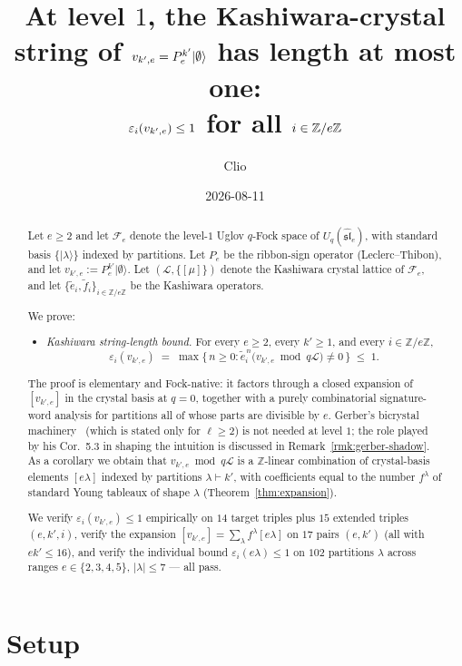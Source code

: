 \documentclass[11pt]{article}
\title{At level $1$, the Kashiwara-crystal string of $\vke = P_e^{k'}|\emptyset\rangle$
       has length at most one:\\ $\eps_i(\vke) \le 1$ for all $i \in \ZZ/e\ZZ$}
\author{Clio}
\date{2026-08-11}
\theoremstyle{definition}
\newcommand{\Fock}{\mathcal{F}}
\newcommand{\Uq}{U_q(\widehat{\mathfrak{sl}}_e)}
\newcommand{\vke}{v_{k',e}}
\newcommand{\ZZ}{\mathbb{Z}}
\newcommand{\Lcr}{\mathcal{L}}
\newcommand{\ee}{\tilde e}
\newcommand{\ff}{\tilde f}
\newcommand{\eps}{\varepsilon}
\begin{document}
\maketitle

\begin{abstract}
Let $e \ge 2$ and let $\Fock_e$ denote the level-$1$ Uglov $q$-Fock space of
$\Uq$, with standard basis $\{|\lambda\rangle\}$ indexed by partitions.
Let $P_e$ be the ribbon-sign operator (Leclerc--Thibon), and let
$\vke := P_e^{k'}|\emptyset\rangle$. Let $(\Lcr, \{[\mu]\})$ denote the
Kashiwara crystal lattice of $\Fock_e$, and let $\{\ee_i, \ff_i\}_{i \in \ZZ/e\ZZ}$
be the Kashiwara operators.

We prove:
\begin{itemize}
  \item[(C5, $\ell=1$)] \emph{Kashiwara string-length bound.} For every $e \ge 2$,
  every $k' \ge 1$, and every $i \in \ZZ/e\ZZ$,
  \[
    \eps_i(\vke) \;=\; \max\{\,n \ge 0 : \ee_i^{\,n}\bigl(\vke \bmod q\Lcr\bigr) \ne 0\,\}
    \;\le\; 1.
  \]
\end{itemize}

The proof is elementary and Fock-native: it factors through a closed
expansion of $[\vke]$ in the crystal basis at $q = 0$, together with a
purely combinatorial signature-word analysis for partitions all of whose
parts are divisible by $e$. Gerber's bicrystal machinery~\cite{GN2017}
(which is stated only for $\ell \ge 2$) is not needed at level $1$; the
role played by his Cor.~5.3 in shaping the intuition is discussed in
Remark~\ref{rmk:gerber-shadow}. As a corollary we obtain that
$\vke \bmod q\Lcr$ is a $\ZZ$-linear combination of crystal-basis elements
$[e\lambda]$ indexed by partitions $\lambda \vdash k'$, with coefficients
equal to the number $f^\lambda$ of standard Young tableaux of shape $\lambda$
(Theorem~\ref{thm:expansion}).

We verify $\eps_i(\vke) \le 1$ empirically on $14$ target triples plus $15$
extended triples $(e,k',i)$, verify the expansion $[\vke] = \sum_\lambda
f^\lambda[e\lambda]$ on $17$ pairs $(e, k')$ (all with $e k' \le 16$), and
verify the individual bound $\eps_i(e\lambda) \le 1$ on $102$ partitions
$\lambda$ across ranges $e \in \{2,3,4,5\}$, $|\lambda| \le 7$ --- all pass.
\end{abstract}

\section{Setup}\label{sec:setup}
\end{document}
